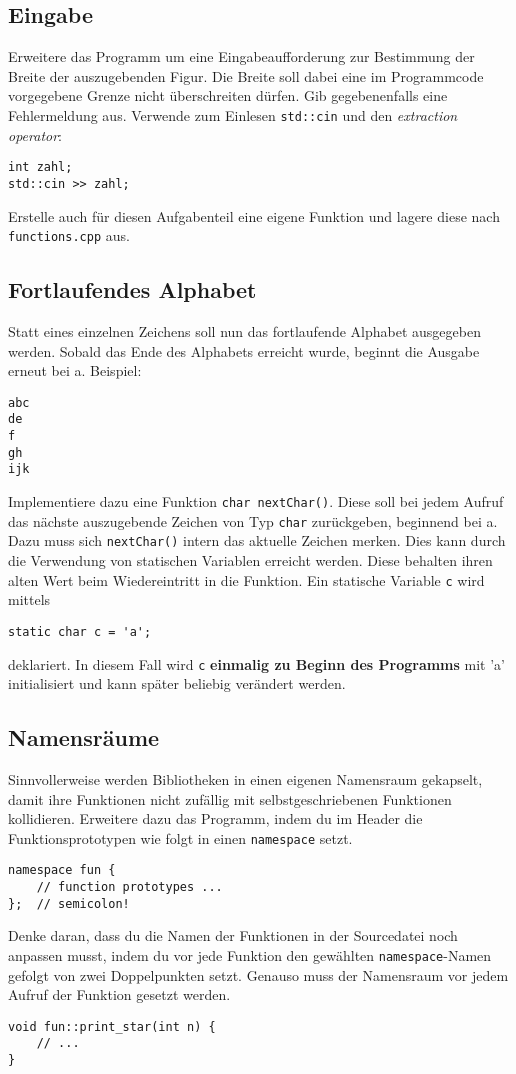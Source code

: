 \subsection{Eingabe}
Erweitere das Programm um eine Eingabeaufforderung zur Bestimmung der Breite der auszugebenden Figur.
Die Breite soll dabei eine im Programmcode vorgegebene Grenze nicht überschreiten dürfen.
Gib gegebenenfalls eine Fehlermeldung aus.
Verwende zum Einlesen \texttt{std::cin} und den \emph{extraction operator}:
\begin{lstlisting}
int zahl;
std::cin >> zahl;
\end{lstlisting}
Erstelle auch für diesen Aufgabenteil eine eigene Funktion und lagere diese nach \texttt{functions.cpp} aus.

\subsection{Fortlaufendes Alphabet}
Statt eines einzelnen Zeichens soll nun das fortlaufende Alphabet ausgegeben werden.
Sobald das Ende des Alphabets erreicht wurde, beginnt die Ausgabe erneut bei \textquotesingle a\textquotesingle.
Beispiel:
\begin{lstlisting}
abc
de
f
gh
ijk
\end{lstlisting}

Implementiere dazu eine Funktion \texttt{char nextChar()}.
Diese soll bei jedem Aufruf das nächste auszugebende Zeichen von Typ \texttt{char} zurückgeben, beginnend bei \textquotesingle a\textquotesingle.
Dazu muss sich \texttt{nextChar()} intern das aktuelle Zeichen merken.
Dies kann durch die Verwendung von statischen Variablen erreicht werden. Diese behalten ihren alten Wert beim Wiedereintritt in die Funktion.
Ein statische Variable \texttt{c} wird mittels
\begin{lstlisting}
static char c = 'a';
\end{lstlisting}
deklariert.
In diesem Fall wird \texttt{c} \textbf{einmalig zu Beginn des Programms} mit 'a' initialisiert und kann später beliebig verändert werden.

\subsection{Namensräume}
Sinnvollerweise werden Bibliotheken in einen eigenen Namensraum gekapselt, damit ihre Funktionen nicht zufällig mit selbstgeschriebenen Funktionen kollidieren.
Erweitere dazu das Programm, indem du im Header die Funktionsprototypen wie folgt in einen \texttt{namespace} setzt.
\begin{lstlisting}
namespace fun {
	// function prototypes ...
};	// semicolon!
\end{lstlisting}
Denke daran, dass du die Namen der Funktionen in der Sourcedatei noch anpassen musst, indem du vor jede Funktion den gewählten \texttt{namespace}-Namen gefolgt von zwei Doppelpunkten setzt. Genauso muss der Namensraum vor jedem Aufruf der Funktion gesetzt werden.
\begin{lstlisting}
void fun::print_star(int n) {
	// ...
}
\end{lstlisting}

